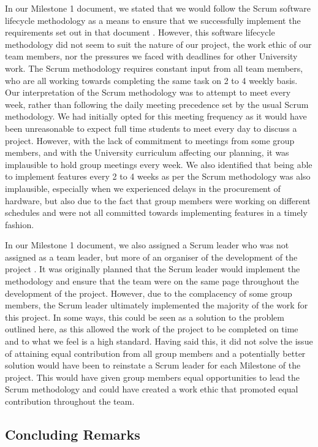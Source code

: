                 In our Milestone 1 document, we stated that we would follow the Scrum software lifecycle methodology as a means to ensure that we successfully implement the requirements set out in that document \cite{coaker}. However, this software lifecycle methodology did not seem to suit the nature of our project, the work ethic of our team members, nor the pressures we faced with deadlines for other University work. The Scrum methodology requires constant input from all team members, who are all working towards completing the same task on 2 to 4 weekly basis. Our interpretation of the Scrum methodology was to attempt to meet every week, rather than following the daily meeting precedence set by the usual Scrum methodology. We had initially opted for this meeting frequency as it would have been unreasonable to expect full time students to meet every day to discuss a project. However, with the lack of commitment to meetings from some group members, and with the University curriculum affecting our planning, it was implausible to hold group meetings every week. We also identified that being able to implement features every 2 to 4 weeks as per the Scrum methodology was also implausible, especially when we experienced delays in the procurement of hardware, but also due to the fact that group members were working on different schedules and were not all committed towards implementing features in a timely fashion.

                In our Milestone 1 document, we also assigned a Scrum leader who was not assigned as a team leader, but more of an organiser of the development of the project \cite{coaker}. It was originally planned that the Scrum leader would implement the methodology and ensure that the team were on the same page throughout the development of the project. However, due to the complacency of some group members, the Scrum leader ultimately implemented the majority of the work for this project. In some ways, this could be seen as a solution to the problem outlined here, as this allowed the work of the project to be completed on time and to what we feel is a high standard. Having said this, it did not solve the issue of attaining equal contribution from all group members and a potentially better solution would have been to reinstate a Scrum leader for each Milestone of the project. This would have given group members equal opportunities to lead the Scrum methodology and could have created a work ethic that promoted equal contribution throughout the team.

        \subsection{Concluding Remarks}

